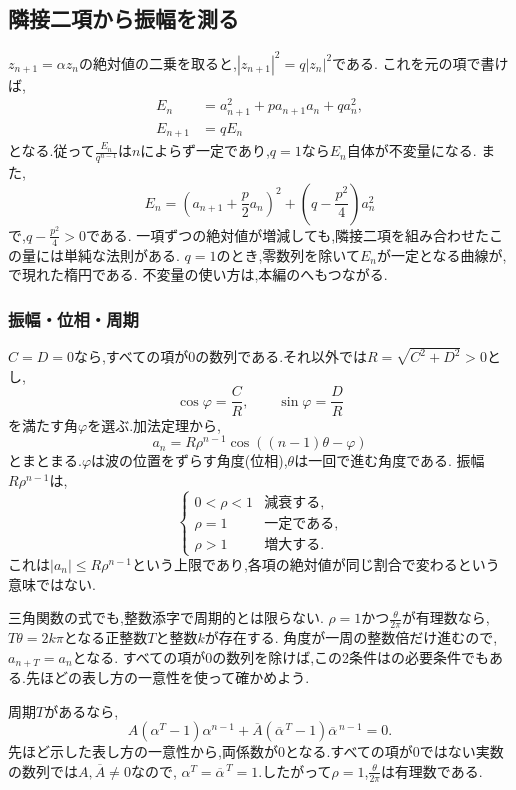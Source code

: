 \subsection{隣接二項から振幅を測る}\label{節：隣接二項から振幅を測る}
$z_{n+1}=\alpha z_n$の絶対値の二乗を取ると,$|z_{n+1}|^2=q|z_n|^2$である.
これを元の項で書けば,
\[
  \begin{aligned}
    E_n&=a_{n+1}^2+pa_{n+1}a_n+qa_n^2,\\
    E_{n+1}&=qE_n
  \end{aligned}
\]
となる.従って$\frac{E_n}{q^{n-1}}$は$n$によらず一定であり,$q=1$なら$E_n$自体が不変量になる.
また,
\[
  E_n=\left(a_{n+1}+\frac{p}{2}a_n\right)^2
      +\left(q-\frac{p^2}{4}\right)a_n^2
\]
で,$q-\frac{p^2}{4}>0$である.
一項ずつの絶対値が増減しても,隣接二項を組み合わせたこの量には単純な法則がある.
$q=1$のとき,零数列を除いて$E_n$が一定となる曲線が,で現れた楕円である.
不変量の使い方は,本編のへもつながる.

\subsubsection{振幅・位相・周期}
$C=D=0$なら,すべての項が0の数列である.それ以外では$R=\sqrt{C^2+D^2}>0$とし,
\[
  \cos\varphi=\frac{C}{R},\qquad \sin\varphi=\frac{D}{R}
\]
を満たす角$\varphi$を選ぶ.加法定理から,
\[
  a_n=R\rho^{n-1}\cos((n-1)\theta-\varphi)
\]
とまとまる.$\varphi$は波の位置をずらす角度(位相),$\theta$は一回で進む角度である.
振幅$R\rho^{n-1}$は,
\[
  \begin{cases}
    0<\rho<1 & \text{減衰する},\\
    \rho=1 & \text{一定である},\\
    \rho>1 & \text{増大する}.
  \end{cases}
\]
これは$|a_n|\le R\rho^{n-1}$という上限であり,各項の絶対値が同じ割合で変わるという意味ではない.

三角関数の式でも,整数添字で周期的とは限らない.
$\rho=1$かつ$\frac{\theta}{2\pi}$が有理数なら,$T\theta=2k\pi$となる正整数$T$と整数$k$が存在する.
角度が一周の整数倍だけ進むので,$a_{n+T}=a_n$となる.
すべての項が0の数列を除けば,この2条件はの必要条件でもある.先ほどの表し方の一意性を使って確かめよう.

周期$T$があるなら,
\[
  A(\alpha^T-1)\alpha^{n-1}
  +\overline A(\overline\alpha^{\,T}-1)\overline\alpha^{\,n-1}=0.
\]
先ほど示した表し方の一意性から,両係数が0となる.すべての項が0ではない実数の数列では$A,\overline A\ne0$なので,
$\alpha^T=\overline\alpha^{\,T}=1$.したがって$\rho=1$,$\frac{\theta}{2\pi}$は有理数である.

